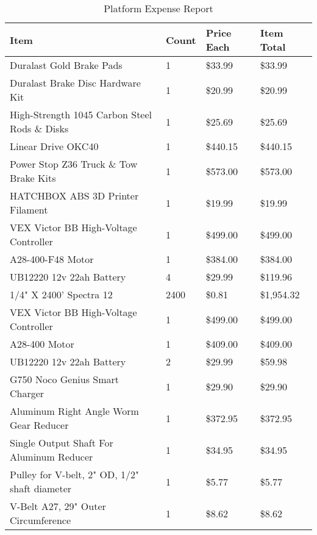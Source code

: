 
\begin{longtable}[H]{| L{8.0cm} | P{1.25cm} | P{2.0cm} | P{2.0cm} |}
\caption{\label{tab:platform_expense_report} Platform Expense Report}

\\ \hline
\textbf{Item}       & \textbf{Count}    & \textbf{Price Each}   & \textbf{Item Total}
\\ \hline
Duralast Gold Brake Pads                & 1	    & \$33.99	&   \$33.99     \\\hline
Duralast Brake Disc Hardware Kit	    & 1	    & \$20.99	&   \$20.99     \\\hline
High-Strength 1045 Carbon Steel Rods \& Disks & 1 & \$25.69 &   \$25.69     \\\hline
Linear Drive OKC40		                & 1	    & \$440.15	&   \$440.15    \\\hline
Power Stop Z36 Truck \& Tow Brake Kits  & 1	    & \$573.00	&   \$573.00    \\\hline
HATCHBOX ABS 3D Printer Filament	    & 1	    & \$19.99	&   \$19.99     \\\hline
VEX Victor BB High-Voltage Controller   &1	    & \$499.00	&   \$499.00    \\\hline
A28-400-F48 Motor			            & 1	    & \$384.00	&   \$384.00    \\\hline
UB12220 12v 22ah Battery	            & 4	    & \$29.99	&   \$119.96    \\/4" X 2400' Spectra 12	                & 2400	& \$0.81	&   \$1,954.32  \\\hline
VEX Victor BB High-Voltage Controller   & 1	    & \$499.00	&   \$499.00    \\\hline
A28-400 Motor			                & 1	    & \$409.00	&   \$409.00    \\\hline
UB12220 12v 22ah Battery			    & 2	    & \$29.99	&   \$59.98     \\\hline
G750 Noco Genius Smart Charger		    & 1	    & \$29.90	&   \$29.90     \\\hline
Aluminum Right Angle Worm Gear Reducer  & 1	    & \$372.95	&   \$372.95    \\\hline
Single Output Shaft For Aluminum Reducer& 1     & \$34.95	&   \$34.95     \\\hline
Pulley for V-belt, 2" OD, 1/2" shaft diameter&1 & \$5.77	&   \$5.77      \\\hline
V-Belt A27, 29" Outer Circumference	    & 1	    & \$8.62	&   \$8.62      \\\hline

\end{longtable}
